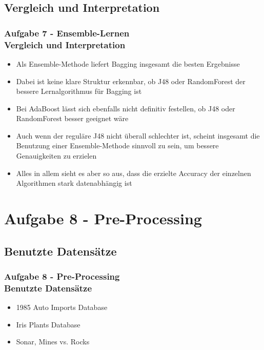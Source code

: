 \documentclass[accentcolor=tud10b,colorbacktitle,inverttitle,landscape,german,presentation,t]{tudbeamer}
\begin{document}
    \subsection{Vergleich und Interpretation}
    
    \begin{frame}[t]
    \frametitle{Aufgabe 7 - Ensemble-Lernen\\ Vergleich und Interpretation}
        \begin{itemize}
            \item Als Ensemble-Methode liefert Bagging insgesamt die besten Ergebnisse
            \item Dabei ist keine klare Struktur erkennbar, ob J48 oder RandomForest der bessere Lernalgorithmus für Bagging ist
            \item Bei AdaBoost lässt sich ebenfalls nicht definitiv festellen, ob J48 oder RandomForest besser geeignet wäre
            \item Auch wenn der reguläre J48 nicht überall schlechter ist, scheint insgesamt die Benutzung einer Ensemble-Methode sinnvoll zu sein, um bessere Genauigkeiten zu erzielen
            \item Alles in allem sieht es aber so aus, dass die erzielte Accuracy der einzelnen Algorithmen stark datenabhängig ist
        \end{itemize}
    \end{frame}
    
    \section{Aufgabe 8 - Pre-Processing}
    
    \subsection{Benutzte Datensätze}
    
    \begin{frame}[t]
    \frametitle{Aufgabe 8 - Pre-Processing\\ Benutzte Datensätze}
        \begin{itemize}
            \item 1985 Auto Imports Database
            \item Iris Plants Database
            \item Sonar, Mines vs. Rocks
        \end{itemize}
    \end{frame}
    
\end{document}
